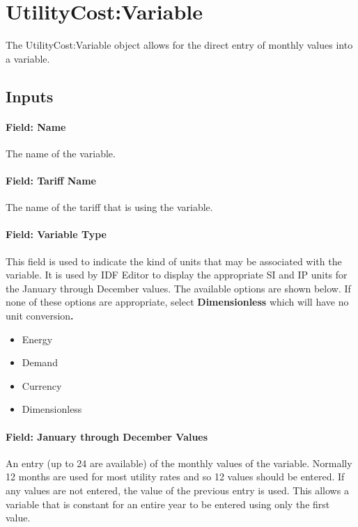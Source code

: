 \section{UtilityCost:Variable}\label{utilitycostvariable}

The UtilityCost:Variable object allows for the direct entry of monthly values into a variable.

\subsection{Inputs}\label{inputs-073}

\paragraph{Field: Name}\label{field-name-065}

The name of the variable.

\paragraph{Field: Tariff Name}\label{field-tariff-name-004}

The name of the tariff that is using the variable.

\paragraph{Field: Variable Type}\label{field-variable-type-000}

This field is used to indicate the kind of units that may be associated with the variable. It is used by IDF Editor to display the appropriate SI and IP units for the January through December values. The available options are shown below. If none of these options are appropriate, select \textbf{Dimensionless} which will have no unit conversion\textbf{.}

\begin{itemize}
\item
  Energy
\item
  Demand
\item
  Currency
\item
  Dimensionless
\end{itemize}

\paragraph{Field: January through December Values}\label{field-january-through-december-values}

An entry (up to 24 are available) of the monthly values of the variable. Normally 12 months are used for most utility rates and so 12 values should be entered. If any values are not entered, the value of the previous entry is used. This allows a variable that is constant for an entire year to be entered using only the first value.
